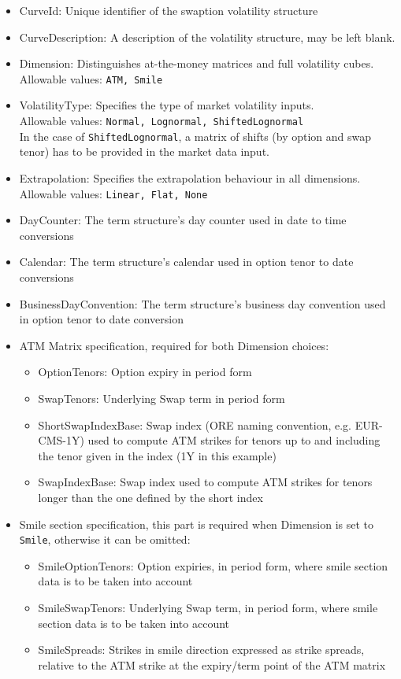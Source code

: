 \documentclass[12pt, a4paper]{article}
\begin{document}
{{\begin{itemize}
\item CurveId: Unique identifier of the swaption volatility structure
\item CurveDescription: A description of the volatility structure, may be left blank.
\item Dimension: Distinguishes at-the-money matrices and full volatility cubes. \\ Allowable values: {\tt ATM, Smile}
\item VolatilityType: Specifies the type of market volatility inputs. \\ 
Allowable values: {\tt Normal, Lognormal, ShiftedLognormal} \\
In the case of {\tt ShiftedLognormal}, a matrix of shifts (by option and swap tenor) has to be provided in the market data input. 
\item Extrapolation: Specifies the extrapolation behaviour in all dimensions. \\ Allowable values: {\tt Linear, Flat, None}
\item DayCounter: The term structure's day counter used in date to time conversions
\item Calendar: The term structure's calendar used in option tenor to date conversions
\item BusinessDayConvention: The term structure's business day convention used in option tenor to date conversion
\item ATM Matrix specification, required for both Dimension choices:
	\begin{itemize}
	\item OptionTenors: Option expiry in period form
	\item SwapTenors: Underlying Swap term in period form
	\item ShortSwapIndexBase: Swap index (ORE naming convention, e.g. EUR-CMS-1Y) used to compute ATM strikes for tenors up to and including the tenor given in the index (1Y in this example)
	\item SwapIndexBase: Swap index used to compute ATM strikes for tenors longer than the one defined by the short index 
	\end{itemize}
\item Smile section specification, this part is required when Dimension is set to {\tt Smile}, otherwise it can be omitted:
	\begin{itemize}
	\item SmileOptionTenors: Option expiries, in period form, where smile section data is to be taken into account
	\item SmileSwapTenors: Underlying Swap term, in period form, where smile section data is to be taken into account
	\item SmileSpreads: Strikes in smile direction expressed as strike spreads, relative to the ATM strike at the expiry/term point of the ATM matrix
	\end{itemize}
\end{itemize}

}}
\end{document}
